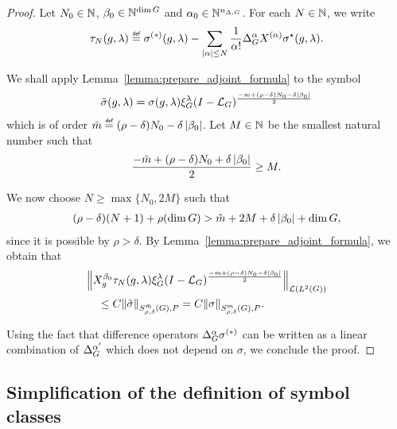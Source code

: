 \begin{proof}
    Let $N_0 \in \mathbb{N}$, $\beta_0 \in \mathbb{N}^{\dim G}$ and $\alpha_0 \in \mathbb{N}^{n_{\Delta, G}}$.
    For each $N \in \mathbb{N}$,
    we write
    \begin{align*}
        \tau_N(g, \lambda) \defeq
        \sigma^{(*)}(g, \lambda)
        - \sum_{\abs \alpha \leq N} \frac 1 {\alpha!} \DifferenceOperatorOrder \alpha \TaylorLeftDifferentialOperator \alpha \adj \sigma(g, \lambda).
    \end{align*}

    We shall apply Lemma~\ref{lemma:prepare_adjoint_formula} to the symbol
    \begin{align*}
        \tilde \sigma(g, \lambda)
        = \sigma(g, \lambda)
        \xi^{\lambda}_{G} (I - {\mathcal{L}_{G}})^\frac{-m + (\rho - \delta) N_0 - \delta \left|{\beta_0}\right|}{2}
    \end{align*}
    which is of order $\tilde m \defeq (\rho - \delta) N_0 - \delta \abs {\beta_0}$.
    Let $M \in \mathbb{N}$ be the smallest natural number such that
    \begin{align*}
        \frac {-\tilde m + (\rho - \delta) N_0 + \delta \left|{\beta_0}\right|} 2 \geq M.
    \end{align*}

    We now choose $N \geq \max \{N_0, 2M\}$ such that
    \begin{align*}
        (\rho - \delta) (N + 1) + \rho (\dim G)
        > \tilde m + 2 M + \delta \left|{\beta_0}\right| + \dim G,
    \end{align*}
    since it is possible by $\rho > \delta$.
    By Lemma~\ref{lemma:prepare_adjoint_formula},
    we obtain that
    \begin{align*}
        &\norm [\Lin {\Lebesgue 2 \Group}] {%
        \LeftDifferentialOperator [g] {\beta_0}
            \tau_N(g, \lambda)
            \Rep \lambda \BesselPotential {-m + (\rho - \delta) N_0 - \delta \abs {\beta_0}}
        }\\
        &\quad \leq C \SymbolSemiNorm {\tilde m} {\rho, \delta} P {\tilde \sigma}
        = C \SymbolSemiNorm m {\rho, \delta} P \sigma.
    \end{align*}

    Using the fact that difference operators ${\Delta_{G}^{\alpha}} \sigma^{(*)}$ can be written as a linear combination of ${\Delta_{G}^{\alpha'}}$ which does not depend on $\sigma$,
    we conclude the proof.
\end{proof}

\subsection{Simplification of the definition of symbol classes}
\label{subsection:simplification_of_symbol_classes_definition}

